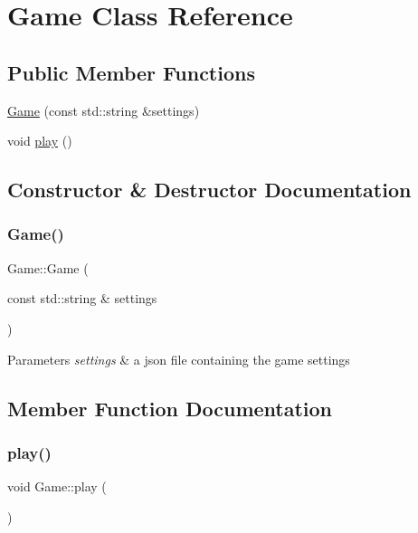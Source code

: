 \hypertarget{classGame}{}\section{Game Class Reference}
\label{classGame}
\subsection*{Public Member Functions}
\begin{DoxyCompactItemize}
\item 
\hyperlink{classGame_ae84079995ee22675be0adfbaa54940d9}{Game} (const std\+::string \&settings)
\item 
void \hyperlink{classGame_aa333825d0bca80e91e53c7e23f053405}{play} ()
\end{DoxyCompactItemize}


\subsection{Constructor \& Destructor Documentation}
\mbox{\label{classGame_ae84079995ee22675be0adfbaa54940d9}} 
\subsubsection{\texorpdfstring{Game()}{Game()}}
{\footnotesize\ttfamily Game\+::\+Game (\begin{DoxyParamCaption}\item[{const std\+::string \&}]{settings }\end{DoxyParamCaption})\hspace{0.3cm}{\ttfamily [explicit]}}


\begin{DoxyParams}{Parameters}
{\em settings} & a json file containing the game settings \\
\hline
\end{DoxyParams}


\subsection{Member Function Documentation}
\mbox{\label{classGame_aa333825d0bca80e91e53c7e23f053405}} 
\subsubsection{\texorpdfstring{play()}{play()}}
{\footnotesize\ttfamily void Game\+::play (\begin{DoxyParamCaption}{ }\end{DoxyParamCaption})}

